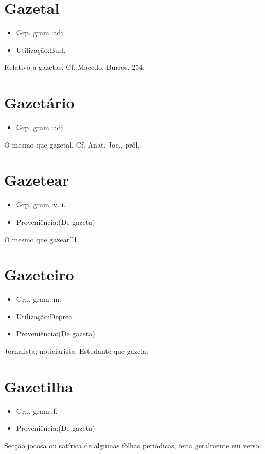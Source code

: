 \section{Gazetal}
\begin{itemize}
\item {Grp. gram.:adj.}
\end{itemize}
\begin{itemize}
\item {Utilização:Burl.}
\end{itemize}
Relativo a gazetas. Cf. Macedo, \textunderscore Burros\textunderscore , 254.
\section{Gazetário}
\begin{itemize}
\item {Grp. gram.:adj.}
\end{itemize}
O mesmo que \textunderscore gazetal\textunderscore . Cf. \textunderscore Anat. Joc.\textunderscore , pról.
\section{Gazetear}
\begin{itemize}
\item {Grp. gram.:v. i.}
\end{itemize}
\begin{itemize}
\item {Proveniência:(De \textunderscore gazeta\textunderscore )}
\end{itemize}
O mesmo que \textunderscore gazear\textunderscore ^1.
\section{Gazeteiro}
\begin{itemize}
\item {Grp. gram.:m.}
\end{itemize}
\begin{itemize}
\item {Utilização:Deprec.}
\end{itemize}
\begin{itemize}
\item {Proveniência:(De \textunderscore gazeta\textunderscore )}
\end{itemize}
Jornalista; noticiarista.
Estudante que gazeia.
\section{Gazetilha}
\begin{itemize}
\item {Grp. gram.:f.}
\end{itemize}
\begin{itemize}
\item {Proveniência:(De \textunderscore gazeta\textunderscore )}
\end{itemize}
Secção jocosa ou satírica de algumas fôlhas periódicas, feita geralmente em verso.
